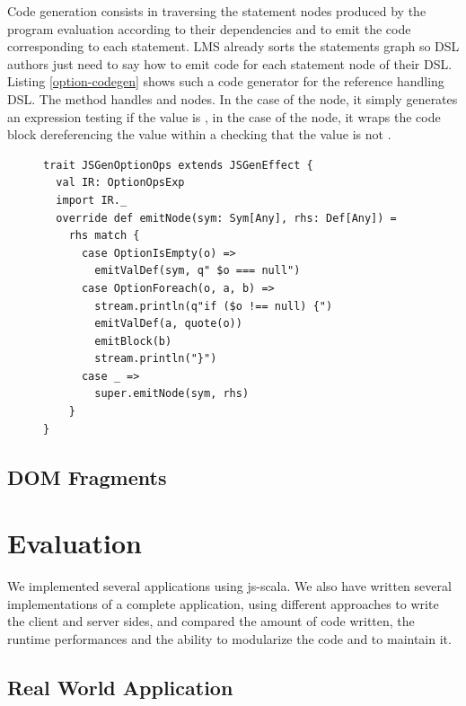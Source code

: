 \documentclass[preprint]{sigplanconf}
\begin{document}
Code generation consists in traversing the statement nodes produced by the program evaluation according to their
dependencies and to emit the code corresponding to each statement. LMS already sorts the statements graph so DSL
authors just need to say how to emit code for each statement node of their DSL. Listing \ref{option-codegen} shows
such a code generator for the  reference handling DSL. The  method handles
 and  nodes. In the case of the  node, it simply
generates an expression testing if the value is , in the case of the  node, it wraps
the code block dereferencing the value within a  checking that the value is not .

\begin{figure}
\begin{lstlisting}[caption=Null reference handling DSL code generator,label=option-codegen]
trait JSGenOptionOps extends JSGenEffect {
  val IR: OptionOpsExp
  import IR._
  override def emitNode(sym: Sym[Any], rhs: Def[Any]) =
    rhs match {
      case OptionIsEmpty(o) =>
        emitValDef(sym, q" $o === null")
      case OptionForeach(o, a, b) =>
        stream.println(q"if ($o !== null) {")
        emitValDef(a, quote(o))
        emitBlock(b)
        stream.println("}")
      case _ =>
        super.emitNode(sym, rhs)
    }
}
\end{lstlisting}
\end{figure}

\subsection{DOM Fragments}

\section{Evaluation}
\label{validation}

We implemented several applications using js-scala. We also have written several implementations of a complete
application, using different approaches to write the client and server sides, and compared the amount of code
written, the runtime performances and the ability to modularize the code and to maintain it.

\subsection{Real World Application}
\end{document}
